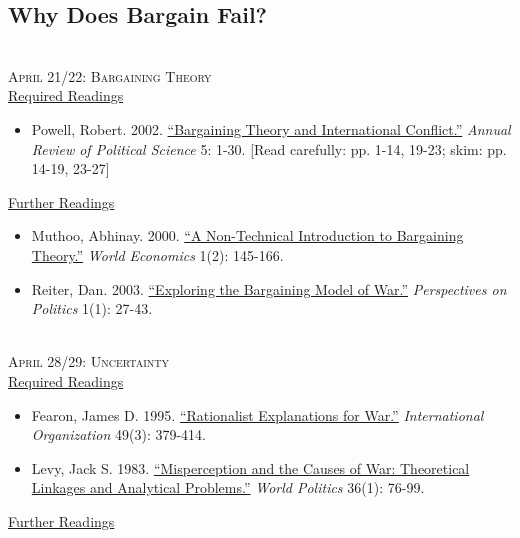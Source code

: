 \documentclass[11pt]{article}
\begin{document}
\vspace{2mm}
\subsection*{Why Does Bargain Fail?}

~\\
\noindent \textsc{April 21/22: Bargaining Theory} \\

\noindent \underline{Required Readings}

\begin{itemize}
\item Powell, Robert. 2002. \href{http://search.ebscohost.com/login.aspx?direct=true&db=buh&AN=6790109&site=ehost-live}{``Bargaining Theory and International Conflict.''} \textit{Annual Review of Political Science} 5: 1-30. [Read carefully: pp. 1-14, 19-23; skim: pp. 14-19, 23-27]
\end{itemize}

\noindent \underline{Further Readings}

\begin{itemize}
\item Muthoo, Abhinay. 2000. \href{http://isites.harvard.edu/fs/docs/icb.topic1188138.files/Week%203/Muthoo_2000.pdf}{``A Non-Technical Introduction to Bargaining Theory.''} \textit{World Economics} 1(2): 145-166.
\item Reiter, Dan. 2003. \href{http://www.jstor.org/stable/3687811}{``Exploring the Bargaining Model of War.''} \textit{Perspectives on Politics} 1(1): 27-43.
\end{itemize}

~\\
\noindent \textsc{April 28/29: Uncertainty} \\

\noindent \underline{Required Readings}

\begin{itemize}
\item Fearon, James D. 1995. \href{http://www.jstor.org/stable/2706903}{``Rationalist Explanations for War.''} \textit{International Organization} 49(3): 379-414.
\item Levy, Jack S. 1983. \href{http://www.jstor.org/stable/2010176}{``Misperception and the Causes of War: Theoretical Linkages and Analytical Problems.''} \textit{World Politics} 36(1): 76-99.
\end{itemize}

\noindent \underline{Further Readings}
\end{document}
